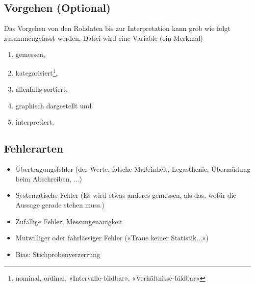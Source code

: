 \subsection{Vorgehen (Optional)}
Das Vorgehen von den Rohdaten bis zur Interpretation kann grob wie folgt zusammengefasst werden. Dabei wird eine Variable (ein Merkmal)
\begin{enumerate}
\item gemessen,
\item kategorisiert\footnote{nominal, ordinal, «Intervalle-bildbar»,
    «Verhältnisse-bildbar»},
\item allenfalls sortiert,
\item graphisch dargestellt und
\item interpretiert.
\end{enumerate}
\newpage


\subsection{Fehlerarten}
\begin{itemize}

\item Übertragungsfehler (der Werte, \zB falsche Maßeinheit,
  Legasthenie, Übermüdung beim Abschreiben, ...)

\item Systematische Fehler (Es wird etwas anderes gemessen, als das,
  wofür die Aussage gerade stehen muss.)

\item Zufällige Fehler, Messungenauigkeit

\item Mutwilliger oder fahrlässiger Fehler («Traue keiner Statistik...»)

\item Bias: Stichprobenverzerrung
\end{itemize}

\newpage
